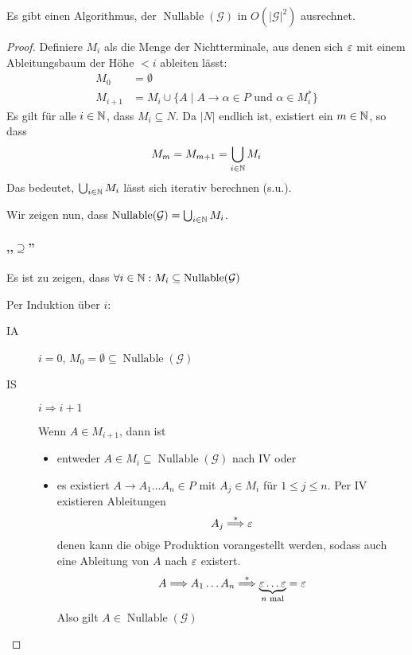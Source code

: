 \begin{Satz}
  Es gibt einen Algorithmus, der $\operatorname{Nullable}(\mathcal{G})$ in $O(|\mathcal{G}|^2)$ ausrechnet.
\end{Satz}
\begin{proof}
  Definiere $M_i$ als die Menge der Nichtterminale, aus denen sich
  $\varepsilon$ mit einem Ableitungsbaum der Höhe $< i$ ableiten lässt:
  \begin{align*}
    M_0 &= \emptyset \\
    M_{i+1} &= M_i \cup \{ A \mid A \to \alpha \in P \text{ und }
              \alpha \in M_i^* \}
  \end{align*}
  Es gilt für alle $i \in \mathbb{N}$, dass $M_i \subseteq N$.
  Da $|N|$ endlich ist, existiert ein $m \in \mathbb{N}$, so dass
  \begin{displaymath}
    M_m = M_{m+1} = \bigcup_{i \in \mathbb{N}} M_i
  \end{displaymath}
  Das bedeutet, $\bigcup_{i \in \mathbb{N}} M_i$ lässt sich iterativ berechnen (s.u.).

  Wir zeigen nun, dass $\operatorname{Nullable}(\mathcal{G}) = \bigcup_{i \in \mathbb{N}} M_i$.

  \paragraph{,,$\supseteq$''}
  Es ist zu zeigen, dass $\forall i \in \mathbb{N}: M_i \subseteq \operatorname{Nullable}(\mathcal{G})$

  Per Induktion über $i$:
  \begin{description}
  \item[IA] $i = 0$, $M_0 = \emptyset \subseteq \operatorname{Nullable}(\mathcal{G})$
  \item[IS] $i \Rightarrow i+1$

    Wenn $A \in M_{i+1}$, dann ist
    \begin{itemize}
    \item entweder
      $A \in M_i \subseteq \operatorname{Nullable}(\mathcal{G})$ nach
      IV oder
    \item 
      es existiert $A \to A_1\ldots A_n \in P$ mit $A_j \in M_i$ für
      $1 \le j \le n$.
      Per IV existieren Ableitungen
      \begin{displaymath}
        A_j \stackrel{*}{\==>} \Eps
      \end{displaymath}
      denen kann die obige Produktion vorangestellt werden, sodass auch
      eine Ableitung von $A$ nach $\varepsilon$ existert.
      \begin{displaymath}
        A  \==> A_1 \ldots A_n \stackrel{*}{\==>} \underbrace{\Eps \ldots \Eps}_{n \text{ mal}} = \Eps
      \end{displaymath}
      Also gilt $A \in \operatorname{Nullable}(\mathcal{G})$
    \end{itemize}
  \end{description}


\end{proof}
